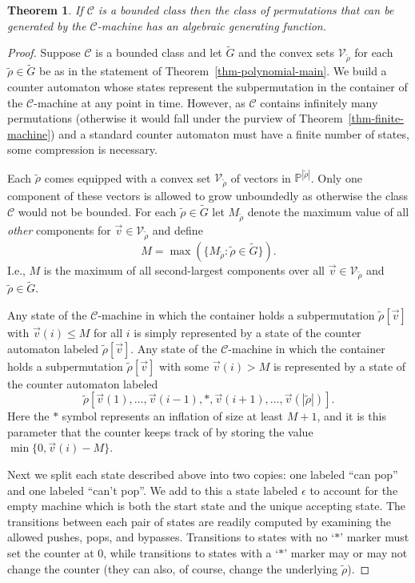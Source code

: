 \documentclass[10pt]{article}
\theoremstyle{plain}
\newtheorem{theorem}{Theorem}[section]
\theoremstyle{definition}
\newcommand{\C}{\mathcal{C}}
\newcommand{\V}{\mathcal{V}}
\begin{document}
\begin{theorem}
\label{thm-bounded-machine}
If $\C$ is a bounded class then the class of permutations that can be generated by the $\C$-machine has an algebraic generating function.
\end{theorem}
\begin{proof}
	Suppose $\C$ is a bounded class and let $\tilde{G}$ and the convex sets $\V_{\tilde{\rho}}$ for each $\tilde{\rho}\in\tilde{G}$ be as in the statement of Theorem~\ref{thm-polynomial-main}. We build a counter automaton whose states represent the subpermutation in the container of the $\C$-machine at any point in time. However, as $\C$ contains infinitely many permutations (otherwise it would fall under the purview of Theorem~\ref{thm-finite-machine}) and a standard counter automaton must have a finite number of states, some compression is necessary.
	
	Each $\tilde{\rho}$ comes equipped with a convex set $\V_{\tilde{\rho}}$ of vectors in $\mathbb{P}^{|\tilde{\rho}|}$. Only one component of these vectors is allowed to grow unboundedly as otherwise the class $\C$ would not be bounded. For each $\tilde{\rho}\in\tilde{G}$ let $M_{\tilde{\rho}}$ denote the maximum value of all \emph{other} components  for $\vec{v}\in\V_{\tilde{\rho}}$ and define
	\[
		M = \max(\{M_{\tilde{\rho}} : \tilde{\rho} \in \tilde{G}\}).
	\]
	I.e., $M$ is the maximum of all second-largest components over all $\vec{v} \in \V_{\tilde{\rho}}$ and $\tilde{\rho} \in \tilde{G}$.
		
	Any state of the $\C$-machine in which the container holds a subpermutation $\tilde{\rho}[\vec{v}]$ with $\vec{v}(i) \leq M$ for all $i$ is simply represented by a state of the counter automaton labeled $\tilde{\rho}[\vec{v}]$. Any state of the $\C$-machine in which the container holds a subpermutation $\tilde{\rho}[\vec{v}]$ with some $\vec{v}(i) > M$ is represented by a state of the counter automaton labeled
		\[
			\tilde{\rho}[\vec{v}(1), \ldots, \vec{v}(i-1), *, \vec{v}(i+1), \ldots, \vec{v}(|\tilde{\rho}|)].
		\]
	Here the $*$ symbol represents an inflation of size at least $M+1$, and it is this parameter that the counter keeps track of by storing the value $\min\{0, \vec{v}(i)-M\}$.
		
	Next we split each state described above into two copies: one labeled ``can pop'' and one labeled ``can't pop''. We add to this a state labeled $\epsilon$ to account for the empty machine which is both the start state and the unique accepting state. The transitions between each pair of states are readily computed by examining the allowed pushes, pops, and bypasses. Transitions to states with no `$*$' marker must set the counter at $0$, while transitions to states with a `$*$' marker may or may not change the counter (they can also, of course, change the underlying $\tilde{\rho}$).
	

\end{proof}
\end{document}
